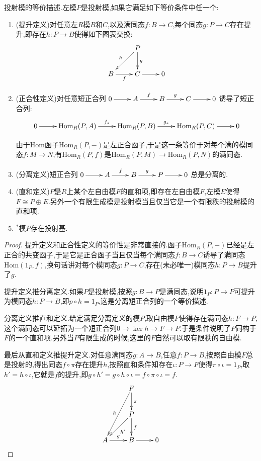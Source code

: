 投射模的等价描述.左模$P$是投射模,如果它满足如下等价条件中任一个:
\begin{enumerate}
	\item (提升定义)对任意左$R$模$B$和$C$,以及满同态$f:B\to C$,每个同态$g:P\to C$存在提升,即存在$h:P\to B$使得如下图表交换:
	$$\xymatrix{&P\ar[dl]_{h}\ar[d]^{g}\\B\ar[r]_{f}&C\ar[r]&0}$$
	\item (正合性定义)对任意短正合列$\xymatrix{0\ar[r]&A\ar[r]^{f}&B\ar[r]^{g}&C\ar[r]&0}$诱导了短正合列:
	$$\xymatrix{0\ar[r]&\mathrm{Hom}_R(P,A)\ar[r]^{f_*}&\mathrm{Hom}_R(P,B) \ar[r]^{g_*}&\mathrm{Hom}_R(P,C)\ar[r]&0}$$
	
	由于Hom函子$\mathrm{Hom}_R(P,-)$是左正合函子,于是这一条等价于对每个满的模同态$f:M\to N$,有$\mathrm{Hom}_R(P,f)$是$\mathrm{Hom}_R(P,M)\to\mathrm{Hom}_R(P,N)$的满同态.
	\item (分离定义)短正合列$\xymatrix{0\ar[r]&A\ar[r]^{f}&B\ar[r]^{g}&P\ar[r]&0}$总是分离的.
	\item (直和定义)$P$是$R$上某个左自由模$F$的直和项,即存在左自由模$F$,左模$E$使得$F\cong P\oplus E$.另外一个有限生成模是投射模当且仅当它是一个有限秩的投射模的直和项.
	\item $^*$模$P$存在投射基.
\end{enumerate}
\begin{proof}
	
	提升定义和正合性定义的等价性是非常直接的.函子$\mathrm{Hom}_R(P,-)$已经是左正合的共变函子,于是它是正合函子当且仅当每个满同态$f:B\to C$诱导了满同态$\mathrm{Hom}(1_P,f)$,换句话讲对每个模同态$g:P\to C$,存在(未必唯一)模同态$h:P\to B$提升了$g$.
	
	提升定义推分离定义.如果$P$是投射模,按照$g:B\to P$是满同态,说明$1_P:P\to P$可提升为模同态$h:P\to B$,即$p\circ h=1_P$,这是分离短正合列的一个等价描述.
	
	分离定义推直和定义.给定满足分离定义的模$P$,取自由模$F$使得存在满同态$h:F\to P$,这个满同态可以延拓为一个短正合列$0\to\ker h\to F\to P$.于是条件说明了$P$同构于$F$的一个直和项.另外当$P$有限生成的时候,这里的$F$自然可以取有限秩的自由模.
	
	最后从直和定义推提升定义.对任意满同态$g:A\to B$,任意$f:P\to B$,按照自由模$F$总是投射的,得出同态$f\circ\pi$存在提升$h$,按照直和条件知存在$\iota:P\to F$使得$\pi\circ\iota=1_P$,取$h'=h\circ\iota$,它就是$f$的提升,即$g\circ h'=g\circ h\circ\iota=f\circ\pi\circ\iota=f$.
	$$\xymatrix{
		&F\ar[d]^{\pi}\ar[ddl]_h&\\
		&P\ar[d]^f\ar[dl]^{h'}&\\
		A\ar[r]^g&B\ar[r]&0}$$
\end{proof}

